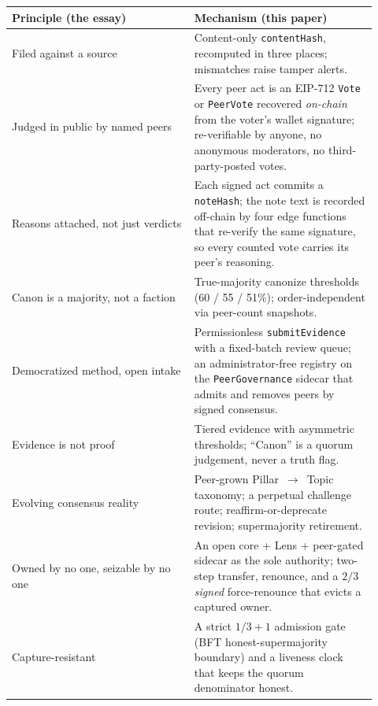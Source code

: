 \documentclass[11pt,a4paper]{article}
\newcommand{\arr}{\ensuremath{\rightarrow}}
\begin{document}
\begin{center}
\begin{tabular}{@{}p{0.46\linewidth}p{0.46\linewidth}@{}}
\toprule
\textbf{Principle (the essay)} & \textbf{Mechanism (this paper)} \\
\midrule
Filed against a source &
Content-only \texttt{contentHash}, recomputed in three places; mismatches
raise tamper alerts. \\[0.4em]
Judged in public by named peers &
Every peer act is an EIP-712 \texttt{Vote} or \texttt{PeerVote} recovered
\emph{on-chain} from the voter's wallet signature; re-verifiable by
anyone, no anonymous moderators, no third-party-posted votes. \\[0.4em]
Reasons attached, not just verdicts &
Each signed act commits a \texttt{noteHash}; the note text is recorded
off-chain by four edge functions that re-verify the same signature, so
every counted vote carries its peer's reasoning. \\[0.4em]
Canon is a majority, not a faction &
True-majority canonize thresholds (60 / 55 / 51\%); order-independent via
peer-count snapshots. \\[0.4em]
Democratized method, open intake &
Permissionless \texttt{submitEvidence} with a fixed-batch review queue;
an administrator-free registry on the \texttt{PeerGovernance} sidecar
that admits and removes peers by signed consensus. \\[0.4em]
Evidence is not proof &
Tiered evidence with asymmetric thresholds; ``Canon'' is a quorum
judgement, never a truth flag. \\[0.4em]
Evolving consensus reality &
Peer-grown Pillar~\arr~Topic taxonomy; a perpetual challenge route;
reaffirm-or-deprecate revision; supermajority retirement. \\[0.4em]
Owned by no one, seizable by no one &
An open core + Lens + peer-gated sidecar as the sole authority; two-step
transfer, renounce, and a $2/3$ \emph{signed} force-renounce that evicts
a captured owner. \\[0.4em]
Capture-resistant &
A strict $1/3{+}1$ admission gate (BFT honest-supermajority boundary)
and a liveness clock that keeps the quorum denominator honest. \\
\bottomrule
\end{tabular}
\end{center}

\vspace{0.6em}
\end{document}
